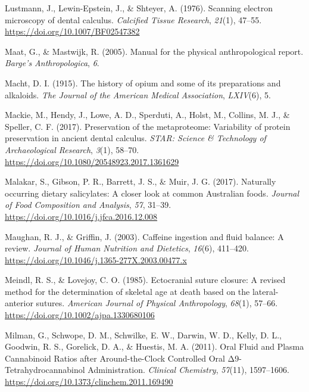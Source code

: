 \documentclass[
  letterpaper,
]{book}
\newlength{\cslhangindent}
\newlength{\cslentryspacingunit} %
\newenvironment{CSLReferences}[2] %
 {%
  \setlength{\parindent}{0pt}
  \ifodd #1
  \let\oldpar\par
  \def\par{\hangindent=\cslhangindent\oldpar}
  \fi
  \setlength{\parskip}{#2\cslentryspacingunit}
 }%
 {}
\begin{document}
\begin{CSLReferences}{1}{0}
\leavevmode{}%
Lustmann, J., Lewin-Epstein, J., \& Shteyer, A. (1976). Scanning
electron microscopy of dental calculus. \emph{Calcified Tissue
Research}, \emph{21}(1), 47--55.
\url{https://doi.org/10.1007/BF02547382}

\leavevmode{}%
Maat, G., \& Mastwijk, R. (2005). Manual for the physical
anthropological report. \emph{Barge's Anthropologica}, \emph{6}.

\leavevmode{}%
Macht, D. I. (1915). The history of opium and some of its preparations
and alkaloids. \emph{The Journal of the American Medical Association},
\emph{LXIV}(6), 5.

\leavevmode{}%
Mackie, M., Hendy, J., Lowe, A. D., Sperduti, A., Holst, M., Collins, M.
J., \& Speller, C. F. (2017). Preservation of the metaproteome:
Variability of protein preservation in ancient dental calculus.
\emph{STAR: Science \& Technology of Archaeological Research},
\emph{3}(1), 58--70. \url{https://doi.org/10.1080/20548923.2017.1361629}

\leavevmode{}%
Malakar, S., Gibson, P. R., Barrett, J. S., \& Muir, J. G. (2017).
Naturally occurring dietary salicylates: {A} closer look at common
{Australian} foods. \emph{Journal of Food Composition and Analysis},
\emph{57}, 31--39. \url{https://doi.org/10.1016/j.jfca.2016.12.008}

\leavevmode{}%
Maughan, R. J., \& Griffin, J. (2003). Caffeine ingestion and fluid
balance: A review. \emph{Journal of Human Nutrition and Dietetics},
\emph{16}(6), 411--420.
\url{https://doi.org/10.1046/j.1365-277X.2003.00477.x}

\leavevmode{}%
Meindl, R. S., \& Lovejoy, C. O. (1985). Ectocranial suture closure: {A}
revised method for the determination of skeletal age at death based on
the lateral-anterior sutures. \emph{American Journal of Physical
Anthropology}, \emph{68}(1), 57--66.
\url{https://doi.org/10.1002/ajpa.1330680106}

\leavevmode{}%
Milman, G., Schwope, D. M., Schwilke, E. W., Darwin, W. D., Kelly, D.
L., Goodwin, R. S., Gorelick, D. A., \& Huestis, M. A. (2011). Oral
{Fluid} and {Plasma Cannabinoid Ratios} after {Around-the-Clock
Controlled Oral Δ9-Tetrahydrocannabinol Administration}. \emph{Clinical
Chemistry}, \emph{57}(11), 1597--1606.
\url{https://doi.org/10.1373/clinchem.2011.169490}


\end{CSLReferences}
\end{document}
